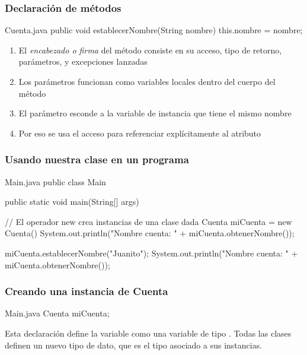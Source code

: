 \documentclass{beamer}
\begin{document}
\begin{frame}[fragile]
  \frametitle{Declaración de métodos}

  \begin{java}{Cuenta.java}
    public void establecerNombre(String nombre) {
      this.nombre = nombre;
    }
  \end{java}

  \begin{enumerate}
    
  \item El \emph{encabezado o firma} del método consiste en su acceso,
    tipo de retorno, parámetros, y excepciones lanzadas
    
  \item Los parámetros funcionan como variables locales dentro del
    cuerpo del método
    
  \item El parámetro  esconde a la variable de instancia
    que tiene el mismo nombre
    
  \item Por eso se usa el acceso  para referenciar
    explícitamente al atributo    
  \end{enumerate}  
  
\end{frame}

\begin{frame}[fragile]
  \frametitle{Usando nuestra clase en un programa}
    \begin{java}{Main.java}
      public class Main {
        public static void main(String[] args) {
          // El operador new crea instancias de una clase dada
          Cuenta miCuenta = new Cuenta()
          System.out.println("Nombre cuenta: " +
                              miCuenta.obtenerNombre());

          miCuenta.establecerNombre("Juanito");
          System.out.println("Nombre cuenta: " +
                              miCuenta.obtenerNombre());
        }
      }
  \end{java}
  
\end{frame}

\begin{frame}[fragile]
  \frametitle{Creando una instancia de Cuenta}

  \begin{java}{Main.java}
    Cuenta miCuenta;
  \end{java}

  \begin{exampleblock}{}
    Esta declaración define la variable  como una
    variable de tipo . Todas las clases definen un nuevo
    tipo de dato, que es el tipo asociado a sus instancias.
  \end{exampleblock}
  
\end{frame}
\end{document}
